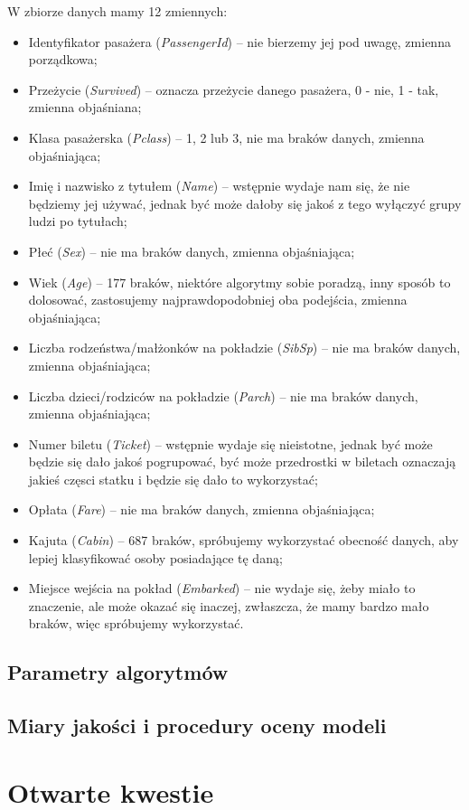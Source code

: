 \documentclass{article}
\begin{document}
W zbiorze danych mamy 12 zmiennych:
\begin{itemize}
\item Identyfikator pasażera ({\itshape PassengerId}) -- nie bierzemy jej pod uwagę, zmienna porządkowa;
\item Przeżycie ({\itshape Survived}) -- oznacza przeżycie danego pasażera, 0 - nie, 1 - tak, zmienna objaśniana;
\item Klasa pasażerska ({\itshape Pclass}) -- 1, 2 lub 3, nie ma braków danych, zmienna objaśniająca;
\item Imię i nazwisko z tytułem ({\itshape Name}) -- wstępnie wydaje nam się, że nie będziemy jej używać, jednak być może dałoby się jakoś z tego wyłączyć grupy ludzi po tytułach;
\item Płeć ({\itshape Sex}) -- nie ma braków danych, zmienna objaśniająca;
\item Wiek ({\itshape Age}) -- 177 braków, niektóre algorytmy sobie poradzą, inny sposób to dolosować, zastosujemy najprawdopodobniej oba podejścia, zmienna objaśniająca;
\item Liczba rodzeństwa/małżonków na pokładzie ({\itshape SibSp}) -- nie ma braków danych, zmienna objaśniająca;
\item Liczba dzieci/rodziców na pokładzie ({\itshape Parch}) -- nie ma braków danych, zmienna objaśniająca;
\item Numer biletu ({\itshape Ticket}) -- wstępnie wydaje się nieistotne, jednak być może będzie się dało jakoś pogrupować, być może przedrostki w biletach oznaczają jakieś częsci statku i będzie się dało to wykorzystać;
\item Opłata ({\itshape Fare}) -- nie ma braków danych, zmienna objaśniająca;
\item Kajuta ({\itshape Cabin}) -- 687 braków, spróbujemy wykorzystać obecność danych, aby lepiej klasyfikować osoby posiadające tę daną;
\item Miejsce wejścia na pokład ({\itshape Embarked}) -- nie wydaje się, żeby miało to znaczenie, ale może okazać się inaczej, zwłaszcza, że mamy bardzo mało braków, więc spróbujemy wykorzystać.
\end{itemize}

\subsection{Parametry algorytmów}
\subsection{Miary jakości i procedury oceny modeli}

\section{Otwarte kwestie}
\end{document}
